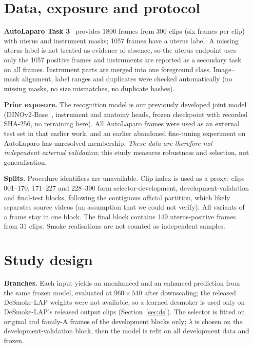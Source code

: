 \documentclass{midl}
\begin{document}
\section{Data, exposure and protocol}
\textbf{AutoLaparo Task 3}~\citep{wang2022autolaparo} provides 1800 frames from 300 clips (six frames per clip) with uterus and instrument masks; 1057 frames have a uterus label. A missing uterus label is not treated as evidence of absence, so the uterus endpoint uses only the 1057 positive frames and instruments are reported as a secondary task on all frames. Instrument parts are merged into one foreground class. Image--mask alignment, label ranges and duplicates were checked automatically (no missing masks, no size mismatches, no duplicate hashes).

\textbf{Prior exposure.} The recognition model is our previously developed joint model (DINOv2-Base~\citep{oquab2024dinov2}, instrument and anatomy heads, frozen checkpoint with recorded SHA-256, no retraining here). All AutoLaparo frames were used as an external test set in that earlier work, and an earlier abandoned fine-tuning experiment on AutoLaparo has unresolved membership. \emph{These data are therefore not independent external validation}; this study measures robustness and selection, not generalisation.

\textbf{Splits.} Procedure identifiers are unavailable. Clip index is used as a proxy; clips 001--170, 171--227 and 228--300 form selector-development, development-validation and final-test blocks, following the contiguous official partition, which likely separates source videos (an assumption that we could not verify). All variants of a frame stay in one block. The final block contains 149 uterus-positive frames from 31 clips. Smoke realisations are not counted as independent samples.

\section{Study design}

\textbf{Branches.} Each input yields an unenhanced and an enhanced prediction from the same frozen model, evaluated at $960{\times}540$ after downscaling; the released DeSmoke-LAP weights were not available, so a learned desmoker is used only on DeSmoke-LAP's released output clips (Section~\ref{sec:ds}). The selector is fitted on original and family-A frames of the development blocks only; $\lambda$ is chosen on the development-validation block, then the model is refit on all development data and frozen.
\end{document}

